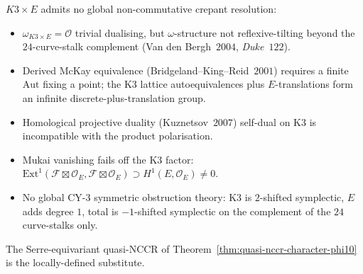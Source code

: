 \begin{remark}
\label{rem:k3xE-nccr-five-obstructions}
$K3 \times E$ admits no global non-commutative crepant resolution:
\begin{itemize}
\item[\textup{(a)}] $\omega_{K3 \times E} = \mathcal{O}$ trivial dualising, but $\omega$-structure not reflexive-tilting beyond the $24$-curve-stalk complement (Van den Bergh~$2004$, \emph{Duke}~$122$).
\item[\textup{(b)}] Derived McKay equivalence (Bridgeland--King--Reid~$2001$) requires a finite $\mathrm{Aut}$ fixing a point; the K3 lattice autoequivalences plus $E$-translations form an infinite discrete-plus-translation group.
\item[\textup{(c)}] Homological projective duality (Kuznetsov~$2007$) self-dual on K3 is incompatible with the product polarisation.
\item[\textup{(d)}] Mukai vanishing fails off the K3 factor: $\mathrm{Ext}^1(\mathcal{F} \boxtimes \mathcal{O}_E, \mathcal{F} \boxtimes \mathcal{O}_E) \supset H^1(E, \mathcal{O}_E) \neq 0$.
\item[\textup{(e)}] No global CY-$3$ symmetric obstruction theory: K3 is $2$-shifted symplectic, $E$ adds degree $1$, total is $-1$-shifted symplectic on the complement of the $24$ curve-stalks only.
\end{itemize}
The Serre-equivariant quasi-NCCR of Theorem~\ref{thm:quasi-nccr-character-phi10} is the locally-defined substitute.
\end{remark}

